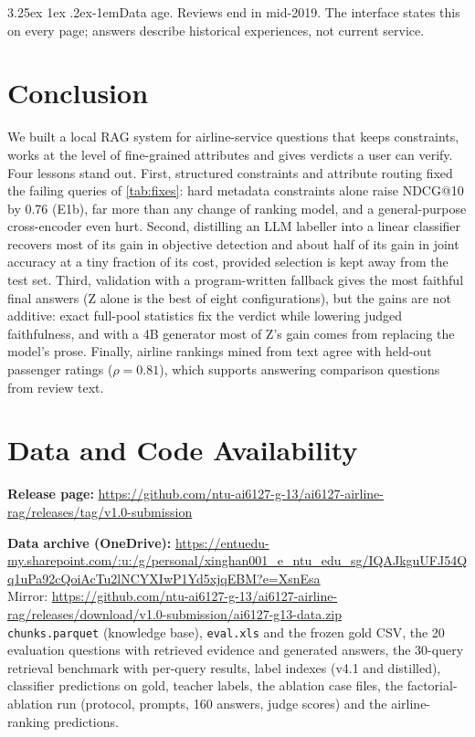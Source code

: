 \documentclass[10pt,twocolumn,a4paper]{article}
\makeatletter
\renewcommand\paragraph{\@startsection{paragraph}{4}{\parindent}%
  {3.25ex \@plus 1ex \@minus .2ex}{-1em}{\normalfont\normalsize\bfseries}}
\makeatother
\begin{document}
\paragraph{Data age.} Reviews end in mid-2019. The interface states this on every page; answers describe historical
experiences, not current service.

\section{Conclusion}

We built a local RAG system for airline-service questions that keeps constraints, works at the level of fine-grained
attributes and gives verdicts a user can verify. Four lessons stand out. First, structured constraints and
attribute routing fixed the failing queries of \cref{tab:fixes}: hard metadata constraints alone raise NDCG@10 by 0.76
(E1b), far more than any change of ranking model, and a general-purpose cross-encoder even hurt. Second, distilling an LLM labeller into a linear classifier recovers most of its gain in objective detection and
about half of its gain in joint accuracy at a tiny fraction of its cost, provided selection is kept away from the test set. Third, validation
with a program-written fallback gives the most faithful final answers (Z alone is the best of eight configurations),
but the gains are not additive: exact full-pool statistics fix the verdict while lowering judged faithfulness, and with
a 4B generator most of Z's gain comes from replacing the model's prose. Finally, airline rankings mined from text agree with held-out passenger ratings ($\rho=0.81$), which
supports answering comparison questions from review text.

\section*{Data and Code Availability}

\textbf{Release page:} \url{https://github.com/ntu-ai6127-g-13/ai6127-airline-rag/releases/tag/v1.0-submission}

\textbf{Data archive (OneDrive):} \url{https://entuedu-my.sharepoint.com/:u:/g/personal/xinghan001_e_ntu_edu_sg/IQAJkguUFJ54Qq1uPa92cQoiAcTu2lNCYXIwP1Yd5xjqEBM?e=XsnEsa}\\
Mirror: \url{https://github.com/ntu-ai6127-g-13/ai6127-airline-rag/releases/download/v1.0-submission/ai6127-g13-data.zip}\\
\nolinkurl{chunks.parquet} (knowledge base), \texttt{eval.xls} and the frozen gold CSV, the 20 evaluation questions with
retrieved evidence and generated answers, the 30-query retrieval benchmark with per-query results, label indexes
(v4.1 and distilled), classifier predictions on gold, teacher labels, the ablation case files, the factorial-ablation run (protocol, prompts, 160 answers, judge scores) and the
airline-ranking predictions.
\end{document}
